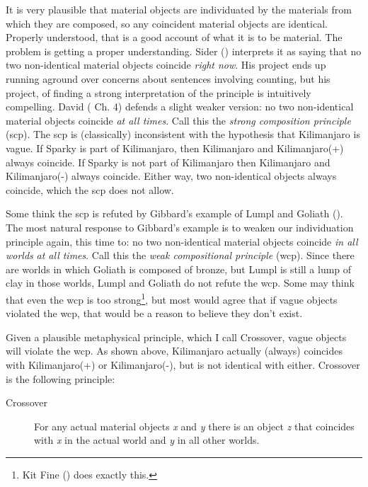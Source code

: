 \documentclass[
  10pt,
  letterpaper,
  DIV=11,
  numbers=noendperiod,
  twoside]{scrartcl}
\begin{document}
It is very plausible that material objects are individuated by the
materials from which they are composed, so any coincident material
objects are identical. Properly understood, that is a good account of
what it is to be material. The problem is getting a proper
understanding. Sider () interprets
it as saying that no two non-identical material objects coincide
\emph{right now}. His project ends up running aground over concerns
about sentences involving counting, but his project, of finding a strong
interpretation of the principle is intuitively compelling. David
( Ch. 4) defends a slight weaker
version: no two non-identical material objects coincide \emph{at all
times}. Call this the \emph{strong composition principle} (scp). The scp
is (classically) inconsistent with the hypothesis that Kilimanjaro is
vague. If Sparky is part of Kilimanjaro, then Kilimanjaro and
Kilimanjaro(+) always coincide. If Sparky is not part of Kilimanjaro
then Kilimanjaro and Kilimanjaro(-) always coincide. Either way, two
non-identical objects always coincide, which the scp does not allow.

Some think the scp is refuted by Gibbard's example of Lumpl and Goliath
(). The most natural response to
Gibbard's example is to weaken our individuation principle again, this
time to: no two non-identical material objects coincide \emph{in all
worlds} \emph{at all times}. Call this the \emph{weak compositional
principle} (wcp). Since there are worlds in which Goliath is composed of
bronze, but Lumpl is still a lump of clay in those worlds, Lumpl and
Goliath do not refute the wcp. Some may think that even the wcp is too
strong\footnote{Kit Fine () does exactly
  this.}, but most would agree that if vague objects violated the wcp,
that would be a reason to believe they don't exist.

Given a plausible metaphysical principle, which I call Crossover, vague
objects will violate the wcp. As shown above, Kilimanjaro actually
(always) coincides with Kilimanjaro(+) or Kilimanjaro(-), but is not
identical with either. Crossover is the following principle:

\begin{description}
\item[Crossover]
For any actual material objects \emph{x} and \emph{y} there is an object
\emph{z} that coincides with \emph{x} in the actual world and \emph{y}
in all other worlds.
\end{description}
\end{document}
